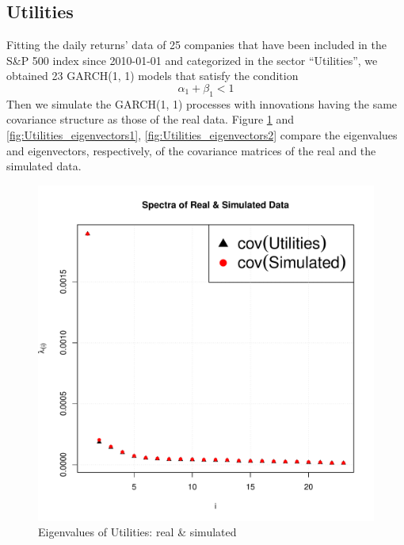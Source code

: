 \documentclass{article}
\begin{document}
\subsection{Utilities}
Fitting the daily returns' data of 25 companies that have been
included in the S\&P 500 index since 2010-01-01 and categorized in the
sector ``Utilities'', we obtained 23 GARCH(1, 1) models that satisfy
the condition
\begin{equation}
  \label{eq:garch_cond1}
  \alpha_1 + \beta_1 < 1  
\end{equation}
Then we simulate the GARCH(1, 1) processes with innovations having the
same covariance structure as those of the real data. Figure
\ref{fig:Utilities_eigenvalues} and \ref{fig:Utilities_eigenvectors1},
\ref{fig:Utilities_eigenvectors2}
compare the eigenvalues and eigenvectors, respectively, of the 
covariance matrices of the real and the simulated data.
\begin{figure}[htb!]
  \centering
  \includegraphics[scale=0.6]{Utilities_eigenvalues.pdf}
  \caption{Eigenvalues of Utilities: real \& simulated}
  \label{fig:Utilities_eigenvalues}
\end{figure}
\end{document}
